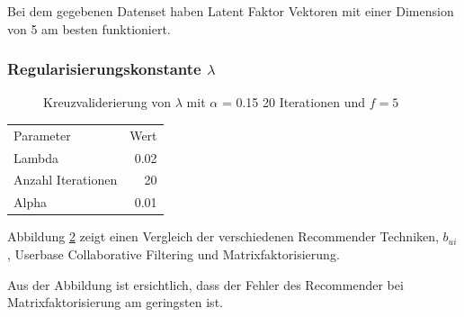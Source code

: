 \documentclass[a4paper, 12pt]{article}
\begin{document}
Bei dem gegebenen Datenset haben Latent Faktor Vektoren mit einer Dimension von 5 am besten funktioniert.

\subsubsection{Regularisierungskonstante $\lambda$}

\begin{figure}
  \centering
{}
\label{fig:lambda}
\caption{Kreuzvaliderierung von $\lambda$ mit $\alpha$ = 0.15 20 Iterationen und $f = 5$}
\end{figure}



\begin{center}
\begin{tabular}{lr}
 Parameter           &  Wert  \\
 Lambda              &  0.02  \\
 Anzahl Iterationen  &    20  \\
 Alpha               &  0.01  \\
\end{tabular}
\end{center}

Abbildung \ref{fig:compare} zeigt einen Vergleich der verschiedenen Recommender Techniken, $b_{ui}$, Userbase Collaborative Filtering und Matrixfaktorisierung.

\begin{figure}
\centering
\label{fig:compare}
\caption{}
\end{figure}

Aus der Abbildung ist ersichtlich, dass der Fehler des Recommender bei Matrixfaktorisierung am geringsten ist.
\end{document}
